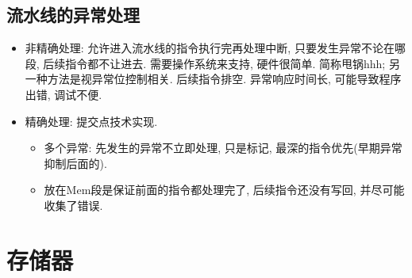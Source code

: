 \documentclass[UTF8]{article}
\begin{document}
\subsection{流水线的异常处理}
\begin{itemize}
\item 非精确处理: 允许进入流水线的指令执行完再处理中断, 只要发生异常不论在哪段, 后续指令都不让进去. 需要操作系统来支持, 硬件很简单. 简称甩锅hhh; 另一种方法是视异常位控制相关. 后续指令排空. 异常响应时间长, 可能导致程序出错, 调试不便.
\item 精确处理: 提交点技术实现.
	\begin{itemize}
	\item 多个异常: 先发生的异常不立即处理, 只是标记, 最深的指令优先(早期异常抑制后面的).
	\item 放在Mem段是保证前面的指令都处理完了, 后续指令还没有写回, 并尽可能收集了错误.
	\end{itemize}
	
\end{itemize}

\section{存储器}
\end{document}
